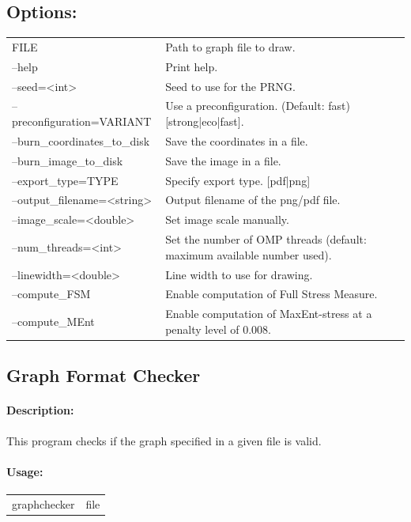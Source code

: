 \documentclass[11pt]{article}
\begin{document}
\subsection*{Options:\\}

\begin{tabularx}{\textwidth}{lX}
  FILE                          & Path to graph file to draw.\\
  --help                        & Print help. \\
  --seed=<int>                  & Seed to use for the PRNG.\\
  --preconfiguration=VARIANT    & Use a preconfiguration. (Default: fast) [strong|eco|fast].\\
  --burn\_coordinates\_to\_disk & Save the coordinates in a file.\\
  --burn\_image\_to\_disk       & Save the image in a file.\\
  --export\_type=TYPE           & Specify export type. [pdf|png]\\
  --output\_filename=<string>   & Output filename of the png/pdf file.\\
  --image\_scale=<double>       & Set image scale manually.\\
  --num\_threads=<int>          & Set the number of OMP threads (default: maximum available number used).\\
  --linewidth=<double>          & Line width to use for drawing.\\
  --compute\_FSM                & Enable computation of Full Stress Measure.\\
  --compute\_MEnt               & Enable computation of MaxEnt-stress at a penalty level of 0.008.\\
\end{tabularx}
\subsection{Graph Format Checker}
\paragraph*{Description:} This program checks if the graph specified in a given file is valid. 
\paragraph*{Usage:\\} 
\begin{tabular}{ll}
graphchecker & file
\end{tabular}
\end{document}

